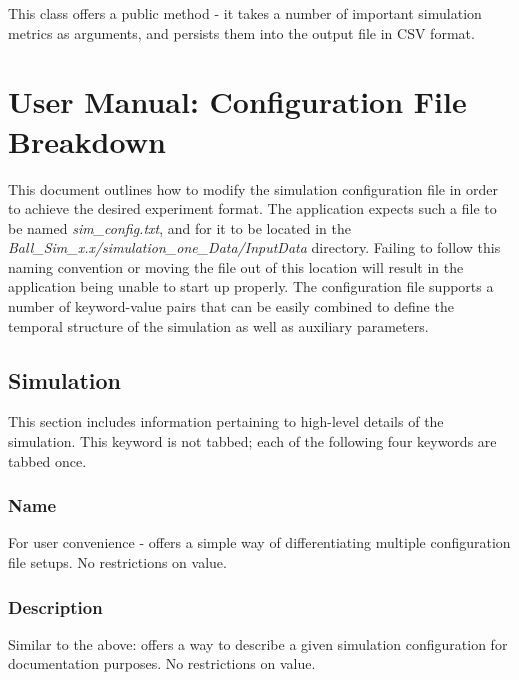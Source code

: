 \documentclass{article}
\begin{document}
This class offers a public method  - it takes a number of important simulation metrics as arguments, and persists them into the output file in CSV format.







\section{User Manual: Configuration File Breakdown}
This document outlines how to modify the simulation configuration file in order to achieve the desired experiment format. The application expects such a file to be named \textit{sim\_config.txt}, and for it to be located in the \textit{Ball\_Sim\_x.x\slash simulation\_one\_Data\slash InputData} directory. Failing to follow this naming convention or moving the file out of this location will result in the application being unable to start up properly. The configuration file supports a number of keyword-value pairs that can be easily combined to define the temporal structure of the simulation as well as auxiliary parameters. 

\subsection{Simulation}
This section includes information pertaining to high-level details of the simulation. This keyword is not tabbed; each of the following four keywords are tabbed once.

\subsubsection{Name} For user convenience - offers a simple way of differentiating multiple configuration file setups. No restrictions on value. 

%

\subsubsection{Description} Similar to the above: offers a way to describe a given simulation configuration for documentation purposes. No restrictions on value. 
\end{document}
